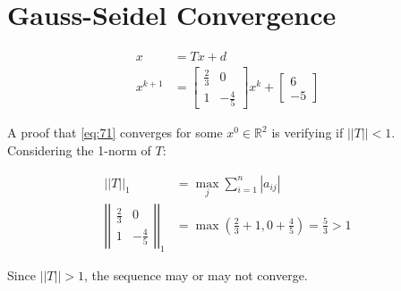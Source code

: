 \section{Gauss-Seidel Convergence}

	\begin{align}
		x &= Tx + d& \\
		x^{k+1} &=
			\begin{bmatrix}
				\frac{2}{3} & 0 \\
				1 & -\frac{4}{5}
			\end{bmatrix}
			x^{k} +
			\begin{bmatrix}
				6 \\
				-5
			\end{bmatrix}&
	\label{eq:71}
	\end{align}

	A proof that \cref{eq:71} converges for some $x^{0} \in \mathbb{R}^{2}$ is verifying if $||T|| < 1$. Considering the 1-norm of $T$:

	\begin{align}
		||T||_{1} &= \max_{j} \sum_{i=1}^{n}|a_{ij}|& \\
		\left|\left|
			\begin{matrix}
				\frac{2}{3} & 0 \\
				1 & -\frac{4}{5}
			\end{matrix}
		\right|\right|_{1}
		&= \max \left(\frac{2}{3}+1,0+\frac{4}{5}\right) = \frac{5}{3} > 1&
	\end{align}

	Since $||T|| > 1$, the sequence may or may not converge.